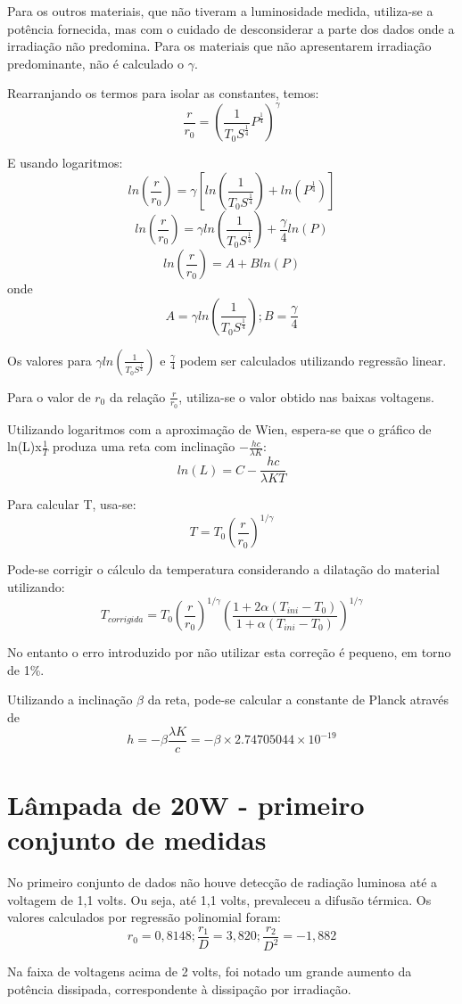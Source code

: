 \documentclass[brazilian,12pt,a4paper,final]{article}
\begin{document}
Para os outros materiais, que não tiveram a luminosidade medida, utiliza-se a potência fornecida, mas com o cuidado de
desconsiderar a parte dos dados onde a irradiação não predomina.
Para os materiais que não apresentarem irradiação predominante, não é calculado o $\gamma$.

Rearranjando os termos para isolar as constantes, temos:
$$\frac{r}{r_0}=(\frac{1}{T_0S^\frac{1}{4}}P^\frac{1}{4})^\gamma$$

E usando logaritmos:
$$ln(\frac{r}{r_0})=\gamma[ln(\frac{1}{T_0S^\frac{1}{4}})+ln(P^\frac{1}{4})]$$
$$ln(\frac{r}{r_0})=\gamma ln(\frac{1}{T_0S^\frac{1}{4}})+\frac{\gamma}{4}ln(P)$$
$$ln(\frac{r}{r_0})=A+Bln(P)$$
onde
$$A=\gamma ln(\frac{1}{T_0S^\frac{1}{4}}); B=\frac{\gamma}{4}$$


Os valores para $\gamma ln(\frac{1}{T_0S^\frac{1}{4}})$
e $\frac{\gamma}{4}$ podem ser calculados utilizando regressão linear.

Para o valor de $r_0$ da relação $\frac{r}{r_0}$, utiliza-se o valor obtido 
nas baixas voltagens.

Utilizando logaritmos com a aproximação de Wien, espera-se que 
o gráfico de ln(L)x$\frac{1}{T}$ produza uma reta com inclinação 
$-\frac{hc}{\lambda K}$:
\[
ln(L) =C-\frac{hc}{\lambda KT}
\]

Para calcular T, usa-se:
$$T=T_0(\frac{r}{r_0})^{1/\gamma}$$

Pode-se corrigir o cálculo da temperatura considerando a dilatação do material utilizando:
$$T_{corrigida}=T_0(\frac{r}{r_0})^{1/\gamma}(\frac{1+2\alpha(T_{ini}-T_0)}{1+\alpha(T_{ini}-T_0)})^{1/\gamma}$$

No entanto o erro introduzido por não utilizar esta correção é pequeno, em torno de 1\%.

Utilizando a inclinação $\beta$ da reta, pode-se calcular a constante de Planck
através de 
\[
h=-\beta \frac{\lambda K}{c}=-\beta \times 2.74705044 \times 10^{-19}
\]

\section{Lâmpada de 20W - primeiro conjunto de medidas}

No primeiro conjunto de dados 
não houve detecção de radiação luminosa até a voltagem de 1,1 volts.
Ou seja, até 1,1 volts, prevaleceu a difusão térmica.
Os valores calculados por regressão polinomial foram:
$$r_0=0,8148; \frac{r_1}{D}=3,820; \frac{r_2}{D^2}=-1,882$$

Na faixa de voltagens acima de 2 volts, foi notado um grande aumento da
potência dissipada, correspondente à dissipação por irradiação.
\end{document}
